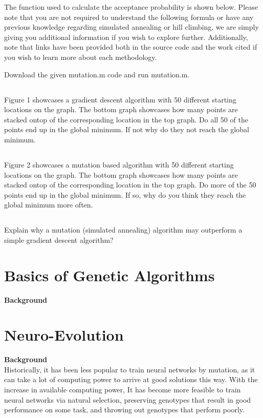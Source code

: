 \documentclass[12]{extarticle}
\begin{document}
The function used to calculate the acceptance probability is shown below\cite{Gnanachandran}. Please note that you are not required to understand the following formula or have any previous knowledge regarding simulated annealing or hill climbing, we are simply giving you additional information if you wish to explore further. Additionally, note that links have been provided both in the source code and the work cited if you wish to learn more about each methodology.



Download the given mutation.m code and run mutation.m.
\subsection{}
Figure 1 showcases a gradient descent algorithm with 50 different starting locations on the graph. The bottom graph showcases how many points are stacked ontop of the corresponding location in the top graph. Do all 50 of the points end up in the global minimum. If not why do they not reach the global minimum.
\subsection{}
Figure 2 showcases a mutation based algorithm with 50 different starting locations on the graph. The bottom graph showcases how many points are stacked ontop of the corresponding location in the top graph. Do more of the 50 points end up in the global minimum. If so, why do you think they reach the global minimum more often.
\subsection{}
Explain why a mutation (simulated annealing) algorithm may outperform a simple gradient descent algorithm?
\section{Basics of Genetic Algorithms}
\textbf{Background} \\


\section{Neuro-Evolution}
\textbf{Background} \\
Historically, it has been less popular to train neural networks by mutation, as it can take a lot of computing power to arrive at good solutions this way. With the increase in available computing power, It has become more feasible to train neural networks via natural selection, preserving genotypes that result in good performance on some task, and throwing out genotypes that perform poorly. 
\end{document}
